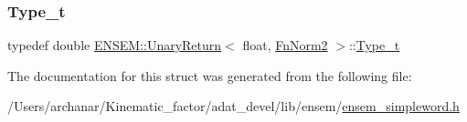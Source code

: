 \mbox{\label{structENSEM_1_1UnaryReturn_3_01float_00_01FnNorm2_01_4_a5b5cece226a8a8fa27c401904bc8948d}} 
\subsubsection{\texorpdfstring{Type\_t}{Type\_t}\hspace{0.1cm}{\footnotesize\ttfamily [2/2]}}
{\footnotesize\ttfamily typedef double \mbox{\hyperlink{structENSEM_1_1UnaryReturn}{E\+N\+S\+E\+M\+::\+Unary\+Return}}$<$ float, \mbox{\hyperlink{structENSEM_1_1FnNorm2}{Fn\+Norm2}} $>$\+::\mbox{\hyperlink{structENSEM_1_1UnaryReturn_3_01float_00_01FnNorm2_01_4_a5b5cece226a8a8fa27c401904bc8948d}{Type\+\_\+t}}}



The documentation for this struct was generated from the following file\+:\begin{DoxyCompactItemize}
\item 
/\+Users/archanar/\+Kinematic\+\_\+factor/adat\+\_\+devel/lib/ensem/\mbox{\hyperlink{lib_2ensem_2ensem__simpleword_8h}{ensem\+\_\+simpleword.\+h}}\end{DoxyCompactItemize}
